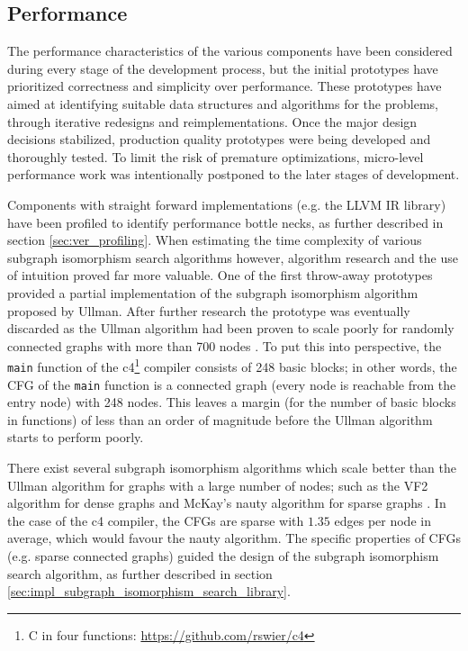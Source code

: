 
\subsection{Performance}

The performance characteristics of the various components have been considered during every stage of the development process, but the initial prototypes have prioritized correctness and simplicity over performance. These prototypes have aimed at identifying suitable data structures and algorithms for the problems, through iterative redesigns and reimplementations. Once the major design decisions stabilized, production quality prototypes were being developed and thoroughly tested. To limit the risk of premature optimizations, micro-level performance work was intentionally postponed to the later stages of development.

Components with straight forward implementations (e.g. the LLVM IR library) have been profiled to identify performance bottle necks, as further described in section \ref{sec:ver_profiling}. When estimating the time complexity of various subgraph isomorphism search algorithms however, algorithm research and the use of intuition proved far more valuable. One of the first throw-away prototypes provided a partial implementation of the subgraph isomorphism algorithm proposed by Ullman. After further research the prototype was eventually discarded as the Ullman algorithm had been proven to scale poorly for randomly connected graphs with more than 700 nodes \cite{iso_performance_comparison}. To put this into perspective, the \texttt{main} function of the c4\footnote{C in four functions: \url{https://github.com/rswier/c4}} compiler consists of 248 basic blocks; in other words, the CFG of the \texttt{main} function is a connected graph (every node is reachable from the entry node) with 248 nodes. This leaves a margin (for the number of basic blocks in functions) of less than an order of magnitude before the Ullman algorithm starts to perform poorly.

There exist several subgraph isomorphism algorithms which scale better than the Ullman algorithm for graphs with a large number of nodes; such as the VF2 algorithm for dense graphs and McKay's nauty algorithm for sparse graphs \cite{iso_performance_comparison,subgraph_isomorphism_algorithms}. In the case of the c4 compiler, the CFGs are sparse with $ 1.35 $ edges per node in average, which would favour the nauty algorithm. The specific properties of CFGs (e.g. sparse connected graphs) guided the design of the subgraph isomorphism search algorithm, as further described in section \ref{sec:impl_subgraph_isomorphism_search_library}.

